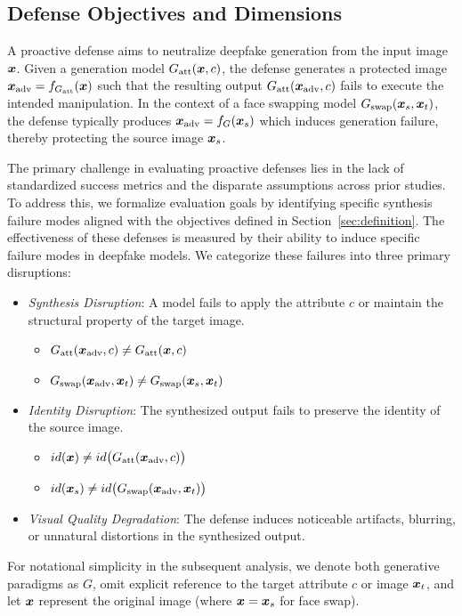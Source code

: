 \documentclass{article}
\begin{document}
\subsection{Defense Objectives and Dimensions}
\label{sec:formulation}

A proactive defense aims to neutralize deepfake generation from the input image ${\bm{x}}$. Given a generation model $G_{\mathrm{att}}({\bm{x}}, c)$, the defense generates a protected image ${\bm{x}}_{\mathrm{adv}} = f_{G_{\mathrm{att}}}({\bm{x}})$ such that the resulting output $G_{\mathrm{att}}({\bm{x}}_{\mathrm{adv}}, c)$ fails to execute the intended manipulation. In the context of a face swapping model $G_{\mathrm{swap}}({\bm{x}}_s, {\bm{x}}_t)$, the defense typically produces ${\bm{x}}_{\mathrm{adv}} = f_G({\bm{x}}_s)$ which induces generation failure, thereby protecting the source image ${\bm{x}}_s$.

The primary challenge in evaluating proactive defenses lies in the lack of standardized success metrics and the disparate assumptions across prior studies. To address this, we formalize evaluation goals by identifying specific synthesis failure modes aligned with the objectives defined in Section~\ref{sec:definition}.
%
The effectiveness of these defenses is measured by their ability to induce specific failure modes in deepfake models. We categorize these failures into three primary disruptions:
\begin{itemize}[leftmargin=*, nosep]
    \item \emph{Synthesis Disruption}: A model fails to apply the attribute $c$ or maintain the structural property of the target image.
    \begin{itemize}[nosep]
        \item $G_{\mathrm{att}}({\bm{x}}_{\mathrm{adv}}, c) \neq G_{\mathrm{att}}({\bm{x}}, c)$
        \item $G_{\mathrm{swap}}({\bm{x}}_{\mathrm{adv}}, {\bm{x}}_t) \neq G_{\mathrm{swap}}({\bm{x}}_s, {\bm{x}}_t)$
    \end{itemize}    
    \item \emph{Identity Disruption}: The synthesized output fails to preserve the identity of the source image. 
    \begin{itemize}[nosep]
        \item $id({\bm{x}}) \neq id\big(G_{\mathrm{att}}({\bm{x}}_{\mathrm{adv}}, c)\big)$
        \item $id({\bm{x}}_s) \neq id\big(G_{\mathrm{swap}}({\bm{x}}_{\mathrm{adv}}, {\bm{x}}_t)\big)$
    \end{itemize}    
    \item \emph{Visual Quality Degradation}: The defense induces noticeable artifacts, blurring, or unnatural distortions in the synthesized output.
\end{itemize}
For notational simplicity in the subsequent analysis, we denote both generative paradigms as $G$, omit explicit reference to the target attribute $c$ or image ${\bm{x}}_t$, and let ${\bm{x}}$ represent the original image (where ${\bm{x}} = {\bm{x}}_s$ for face swap).
\end{document}
